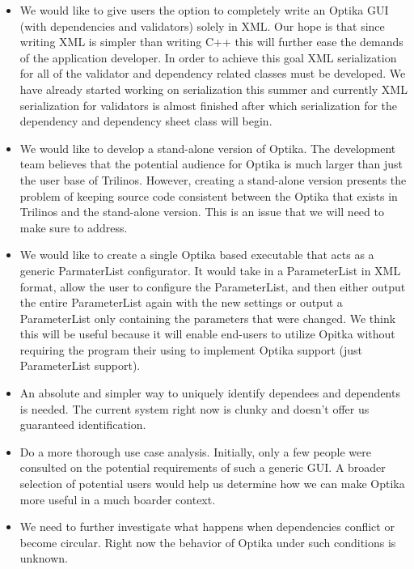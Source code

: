 \begin{itemize}
\item We would like to give users the option to completely write an Optika GUI (with dependencies and validators)
solely in XML. Our hope is that since writing XML is simpler than writing C++ this will further ease the demands of the application developer.
In order to achieve this goal XML serialization for all of the validator and dependency related classes must be developed. We have already started working on
serialization this summer and currently XML serialization for validators is almost finished after which serialization for the dependency and dependency sheet class will begin.

\item We would like to develop a stand-alone version of Optika. The development team believes that the potential audience for Optika is much 
larger than just the user base of Trilinos. However, creating a stand-alone version presents the problem of keeping source code consistent between
the Optika that exists in Trilinos and the stand-alone version. This is an issue that we will need to make sure to address.

\item We would like to create a single Optika based executable that acts as a generic ParmaterList configurator. It would take in a ParameterList in
XML format, allow the user to configure the ParameterList, and then either output the entire ParameterList again with the new settings or output
a ParameterList only containing the parameters that were changed. We think this will be useful because it will enable end-users to utilize
Opitka without requiring the program their using to implement Optika support (just ParameterList support).

\item An absolute and simpler way to uniquely identify dependees and dependents is needed.
The current system right now is clunky and doesn't offer us guaranteed identification.

\item Do a more thorough use case analysis. Initially, only a few people were consulted on the potential requirements
of such a generic GUI. A broader selection of potential users would help us determine how we can make Optika
more useful in a much boarder context.

\item We need to further investigate what happens when dependencies conflict
or become circular. Right now the behavior of Optika under such conditions
is unknown.

\end{itemize}

